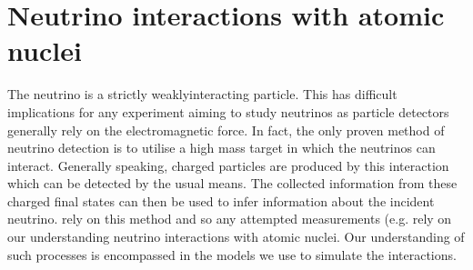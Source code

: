 


\chapter{Neutrino interactions with atomic nuclei}
\label{chap:NeutrinoInteractionsAtomicNuclei}
The neutrino is a strictly weaklyinteracting particle.  This has difficult implications for any experiment aiming to study neutrinos as particle detectors generally rely on the electromagnetic force.  In fact, the only proven method of neutrino detection is to utilise a high mass target in which the neutrinos can interact.  Generally speaking, charged particles are produced by this interaction which can be detected by the usual means.  The collected information from these charged final states can then be used to infer information about the incident neutrino.   rely on this method and so any attempted measurements (e.g.  rely on our understanding  neutrino interactions with atomic nuclei.  Our understanding of such processes is encompassed in the models we use to simulate the interactions.

